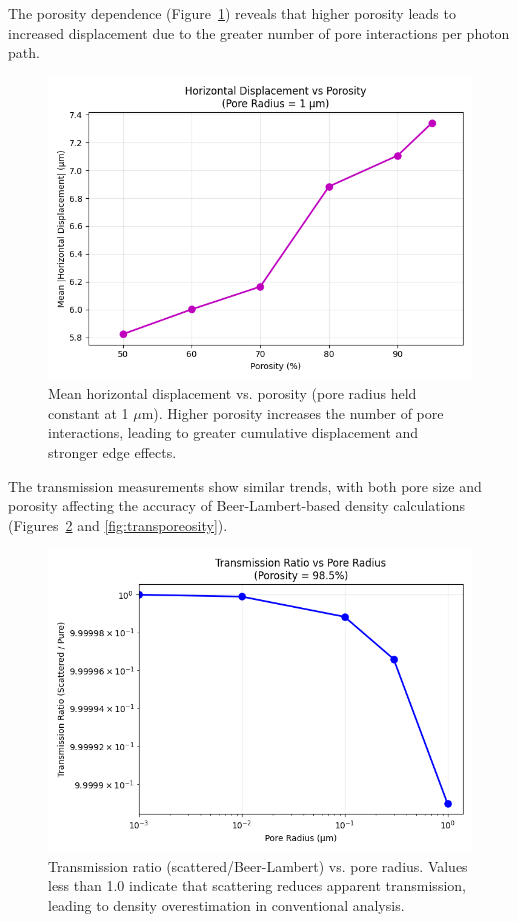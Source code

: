 \documentclass[twocolumn]{aastex701}
\begin{document}
The porosity dependence (Figure~\ref{fig:dxporosity}) reveals that higher porosity leads to increased displacement due to the greater number of pore interactions per photon path.

\begin{figure}[htbp]
  \centering
  \includegraphics[width=\linewidth]{dxvsporositynew.png}
  \caption{Mean horizontal displacement vs. porosity (pore radius held constant at 1 $\mu$m). Higher porosity increases the number of pore interactions, leading to greater cumulative displacement and stronger edge effects.}
  \label{fig:dxporosity}
\end{figure}

The transmission measurements show similar trends, with both pore size and porosity affecting the accuracy of Beer-Lambert-based density calculations (Figures~\ref{fig:transrad} and \ref{fig:transporeosity}).

\begin{figure}[htbp]
  \centering
  \includegraphics[width=\linewidth]{transmissionvspore1.png}
  \caption{Transmission ratio (scattered/Beer-Lambert) vs. pore radius. Values less than 1.0 indicate that scattering reduces apparent transmission, leading to density overestimation in conventional analysis.}
  \label{fig:transrad}
\end{figure}
\end{document}
